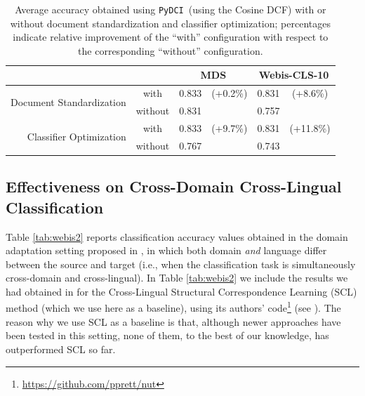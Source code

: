 \documentclass{article}
\newcommand{\pydci}{\texttt{PyDCI}}
\begin{document}
\begin{table}[t]
  \begin{center}
    \begin{tabular}{|r|c||cc|cc|}
      \hline
      & & \multicolumn{2}{c|}{MDS} & \multicolumn{2}{c|}{Webis-CLS-10} \\
      \hline\hline
      \multirow{2}{*}{Document Standardization} & with    & 0.833 & (+0.2\%) & 0.831 & (+8.6\%) \\
      & without & 0.831 &          & 0.757 &    \\
      \hline
      \multirow{2}{*}{Classifier Optimization} & with    & 0.833 & (+9.7\%) & 0.831 & (+11.8\%) \\
      & without & 0.767 &          & 0.743 &    \\
      \hline
    \end{tabular}
  \end{center}
  \caption{\label{tab:modifications}Average accuracy obtained using
  \pydci\ (using the Cosine DCF) with or without document
  standardization and classifier optimization; percentages indicate
  relative improvement of the ``with'' configuration with respect to
  the corresponding ``without'' configuration.}
\end{table}%


\subsection{Effectiveness on Cross-Domain Cross-Lingual
Classification}
\label{sec:CDCL}

\noindent Table \ref{tab:webis2} reports classification accuracy
values obtained in the domain adaptation setting proposed in
\citep{Moreo:2016fg}, in which both domain \emph{and} language differ
between the source and target (i.e., when the classification task is
simultaneously cross-domain and cross-lingual). In Table
\ref{tab:webis2} we include the results we had obtained in
\citep{Moreo:2016fg} for the Cross-Lingual Structural Correspondence
Learning (SCL) method \citep{Prettenhofer:2010ys} (which we use here
as a baseline), using its authors'
code\footnote{\url{https://github.com/pprett/nut}} (see
\citep{prettenhofer2011cross}). The reason why we use SCL as a
baseline is that, although newer approaches have been tested in this
setting, none of them, to the best of our knowledge, has outperformed
SCL so far.
\end{document}
